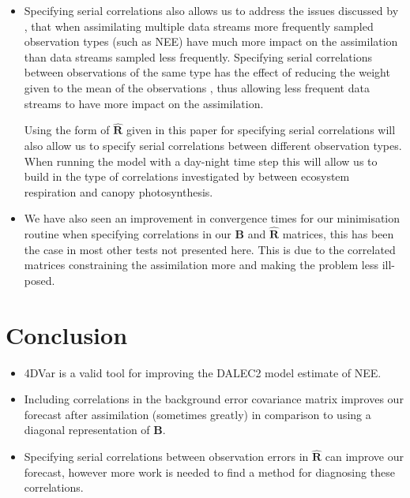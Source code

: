 \documentclass[11pt]{article}
\begin{document}
\begin{itemize}
\item Specifying serial correlations also allows us to address the issues discussed by \citet{richardson2010estimating}, that when assimilating multiple data streams more frequently sampled observation types (such as NEE) have much more impact on the assimilation than data streams sampled less frequently. Specifying serial correlations between observations of the same type has the effect of reducing the weight given to the mean of the observations \citep{jarvinen1999variational}, thus allowing less frequent data streams to have more impact on the assimilation. 

Using the form of $\hat{\mathbf{R}}$ given in this paper for specifying serial correlations will also allow us to specify serial correlations between different observation types. When running the model with a day-night time step this will allow us to build in the type of correlations investigated by \citet{Baldocchi2015} between ecosystem respiration and canopy photosynthesis.

\item We have also seen an improvement in convergence times for our minimisation routine when specifying correlations in our $\textbf{B}$ and $\hat{\mathbf{R}}$ matrices, this has been the case in most other tests not presented here. This is due to the correlated matrices constraining the assimilation more and making the problem less ill-posed.
\end{itemize} 

\section{Conclusion}

\begin{itemize}
\item 4DVar is a valid tool for improving the DALEC2 model estimate of NEE.
\item Including correlations in the background error covariance matrix improves our forecast after assimilation (sometimes greatly) in comparison to using a diagonal representation of $\textbf{B}$.
\item Specifying serial correlations between observation errors in $\hat{\textbf{R}}$ can improve our forecast, however more work is needed to find a method for diagnosing these correlations.
\end{itemize}
\end{document}
